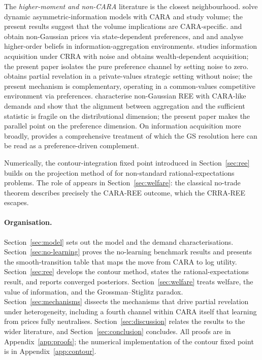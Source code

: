 \documentclass[12pt,letterpaper]{article}
\theoremstyle{definition}
\theoremstyle{remark}
\newcommand{\1}{\mathbf{1}}
\begin{document}
The \emph{higher-moment and non-CARA} literature is the closest
neighbourhood. \citet{Wang1993,Wang1994} solve dynamic
asymmetric-information models with CARA and study volume; the present
results suggest that the volume implications are CARA-specific.
\citet{BarlevyVeronesi2003} and \citet{Mele2007} obtain non-Gaussian
prices via state-dependent preferences, and \citet{AllenMorrisShin2006}
and \citet{KasaWalkerWhiteman2014} analyse higher-order beliefs in
information-aggregation environments. \citet{Peress2004} studies
information acquisition under CRRA with noise and obtains
wealth-dependent acquisition; the present paper isolates the pure
preference channel by setting noise to zero. \citet{Vives2011} obtains
partial revelation in a private-values strategic setting without noise;
the present mechanism is complementary, operating in a common-values
competitive environment via preferences.
\citet{AlbagliHellwigTsyvinski2024} characterise non-Gaussian REE with
CARA-like demands and show that the alignment between aggregation and
the sufficient statistic is fragile on the distributional dimension; the
present paper makes the parallel point on the preference dimension. On
information acquisition more broadly, \citet{VeldkampBook} provides a
comprehensive treatment of which the GS resolution here can be read as a
preference-driven complement.

Numerically, the contour-integration fixed point introduced in
Section~\ref{sec:ree} builds on the projection method of
\citet{BreugemBuss2019} for non-standard rational-expectations problems.
The role of \citet{Milgrom1982} appears in Section~\ref{sec:welfare}: the
classical no-trade theorem describes precisely the CARA-REE outcome,
which the CRRA-REE escapes.

\paragraph{Organisation.}
Section~\ref{sec:model} sets out the model and the demand
characterisations. Section~\ref{sec:no-learning} proves the no-learning
benchmark results and presents the smooth-transition table that maps the
move from CARA to log utility. Section~\ref{sec:ree} develops the contour
method, states the rational-expectations result, and reports converged
posteriors. Section~\ref{sec:welfare} treats welfare, the value of
information, and the Grossman--Stiglitz paradox.
Section~\ref{sec:mechanisms} dissects the mechanisms that drive
partial revelation under heterogeneity, including a fourth channel within
CARA itself that learning from prices fully neutralises.
Section~\ref{sec:discussion} relates
the results to the wider literature, and Section~\ref{sec:conclusion}
concludes. All proofs are in Appendix~\ref{app:proofs}; the numerical
implementation of the contour fixed point is in Appendix~\ref{app:contour}.
\end{document}
